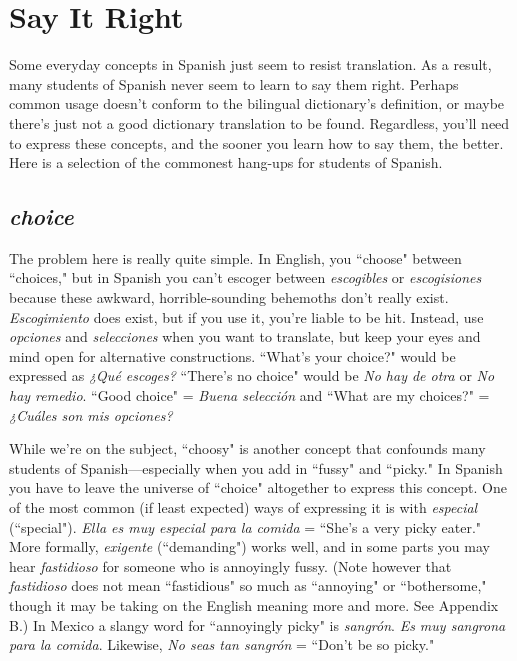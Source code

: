 \chapter{Say It Right}

Some everyday concepts in Spanish just seem to resist translation. As a result, many students of Spanish never seem to learn to say
them right. Perhaps common usage doesn't conform to the bilingual
dictionary's definition, or maybe there's just not a good dictionary
translation to be found. Regardless, you'll need to express these concepts, and the sooner you learn how to say them, the better. Here is a
selection of the commonest hang-ups for students of Spanish.

\section{\emph{choice}}

The problem here is really quite simple. In English, you
``choose" between ``choices," but in Spanish you can't escoger between
\emph{escogibles} or \emph{escogisiones} because these awkward, horrible-sounding
behemoths don't really exist. \emph{Escogimiento} does exist, but if you use
it, you're liable to be hit. Instead, use \emph{opciones} and \emph{selecciones} when
you want to translate, but keep your eyes and mind open for alternative constructions. ``What's your choice?" would be expressed as \emph{¿Qué
escoges?} ``There's no choice" would be \emph{No hay de otra} or \emph{No hay remedio}. ``Good choice" = \emph{Buena selección} and ``What are my choices?"
= \emph{¿Cuáles son mis opciones?}

While we're on the subject, ``choosy" is another concept that
confounds many students of Spanish---especially when you add in
``fussy" and ``picky." In Spanish you have to leave the universe of
``choice" altogether to express this concept. One of the most common
(if least expected) ways of expressing it is with \emph{especial} (``special").
\emph{Ella es muy especial para la comida} = ``She's a very picky eater."
More formally, \emph{exigente} (``demanding") works well, and in some parts
you may hear \emph{fastidioso} for someone who is annoyingly fussy. (Note
however that \emph{fastidioso} does not mean ``fastidious" so much as ``annoying" or ``bothersome," though it may be taking on the English
meaning more and more. See Appendix B.) In Mexico a slangy word
for ``annoyingly picky" is \emph{sangrón}. \emph{Es muy sangrona para la comida}.
Likewise, \emph{No seas tan sangrón} = ``Don't be so picky."

